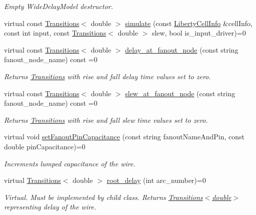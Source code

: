 \begin{DoxyCompactItemize}
\begin{DoxyCompactList}\small\item\em Empty Wide\-Delay\-Model destructor. \end{DoxyCompactList}\item 
virtual const \hyperlink{classTransitions}{Transitions}$<$ double $>$ \hyperlink{classWireDelayModel_a8375f713365be98c03672dbeb28eb930}{simulate} (const \hyperlink{structLibertyCellInfo}{Liberty\-Cell\-Info} \&cell\-Info, const int input, const \hyperlink{classTransitions}{Transitions}$<$ double $>$ slew, bool is\-\_\-input\-\_\-driver)=0
\item 
virtual const \hyperlink{classTransitions}{Transitions}$<$ double $>$ \hyperlink{classWireDelayModel_a45a83dd192bcbf2a70ee13899256fe0d}{delay\-\_\-at\-\_\-fanout\-\_\-node} (const string fanout\-\_\-node\-\_\-name) const =0
\begin{DoxyCompactList}\small\item\em Returns \hyperlink{classTransitions}{Transitions} with rise and fall delay time values set to zero. \end{DoxyCompactList}\item 
virtual const \hyperlink{classTransitions}{Transitions}$<$ double $>$ \hyperlink{classWireDelayModel_adaf486017e2ad91a900a9bef4e6f9340}{slew\-\_\-at\-\_\-fanout\-\_\-node} (const string fanout\-\_\-node\-\_\-name) const =0
\begin{DoxyCompactList}\small\item\em Returns \hyperlink{classTransitions}{Transitions} with rise and fall slew time values set to zero. \end{DoxyCompactList}\item 
virtual void \hyperlink{classWireDelayModel_a27d557bc1f2ed7e5e9787a8a5d82ecb2}{set\-Fanout\-Pin\-Capacitance} (const string fanout\-Name\-And\-Pin, const double pin\-Capacitance)=0
\begin{DoxyCompactList}\small\item\em Increments lumped capacitance of the wire. \end{DoxyCompactList}\item 
virtual \hyperlink{classTransitions}{Transitions}$<$ double $>$ \hyperlink{classWireDelayModel_a4f4ab93810af8ad90fd9fca0b06de141}{root\-\_\-delay} (int arc\-\_\-number)=0
\begin{DoxyCompactList}\small\item\em Virtual. Must be implemented by child class. Returns \hyperlink{classTransitions}{Transitions$<$double$>$} representing delay of the wire. \end{DoxyCompactList}\item 

\end{DoxyCompactItemize}
